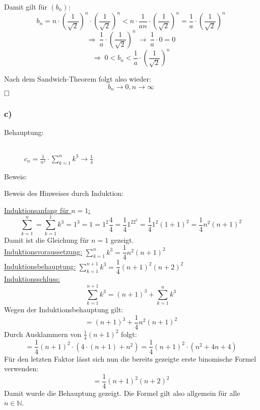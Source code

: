 \documentclass[10pt, a4paper]{article}
\begin{document}
			Damit gilt für $(b_n)$:
			\[
				b_n = n \cdot \left( \dfrac{1}{\sqrt{2}} \right)^{n} \cdot \left( \dfrac{1}{\sqrt{2}} \right)^{n} < n\cdot \dfrac{1}{an} \cdot \left( \dfrac{1}{\sqrt{2}} \right)^{n} = \dfrac{1}{a} \cdot \left(\dfrac{1}{\sqrt{2}}\right)^n
			\]
			\[
				\Rightarrow \ \dfrac{1}{a} \cdot \left(\dfrac{1}{\sqrt{2}}\right)^n \ \longrightarrow \ \dfrac{1}{a} \cdot 0 = 0 
			\]
			\[
				\Rightarrow \ 0 < b_n < \dfrac{1}{a} \cdot \left(\dfrac{1}{\sqrt{2}}\right)^n
			\]

			Nach dem Sandwich-Theorem folgt also wieder:
			\[
				b_n\longrightarrow 0,n\longrightarrow \infty
			\]
			$\hfill\Box$


		\subsubsection*{c)} %
		\label{ssub:c_}
		
			\begin{description}
				\item[Behauptung:] \hfill \\
					$c_n = \frac{1}{n^4}\cdot \sum_{k=1}^n k^3 \longrightarrow \frac{1}{4}$
				\item[Beweis:]
			\end{description}
			
			Beweis des Hinweises durch Induktion:

			\underline{Induktionsanfang für $n=1$:}\\
			\[
				\sum_{k=1}^n = \sum_{k=1}^1 k^3 = 1^3 = 1 = 1^2\dfrac{4}{4}= \dfrac{1}{4}1^22^2 = \dfrac{1}{4}1^2(1+1)^2 = \dfrac{1}{4}n^2(n+1)^2
			\]
			Damit ist die Gleichung für $n=1$ gezeigt.\\

			\underline{Induktionsvoraussetzung:} $\sum_{k=1}^n k^3 = \dfrac{1}{4}n^2(n+1)^2$ \\

			\underline{Induktionsbehauptung:} $\sum_{k=1}^{n+1} k^3 = \dfrac{1}{4}(n+1)^2(n+2)^2$\\

			\underline{Induktionsschluss:}
			\[
				\sum_{k=1}^{n+1} k^3 = (n+1)^3 + \sum_{k=1}^n k^3
			\]
			Wegen der Induktionsbehauptung gilt:
			\[
				= (n+1)^3 + \dfrac{1}{4}n^2(n+1)^2
			\]
			Durch Ausklammern von $\frac{1}{4}(n+1)^2$ folgt:
			\[
				= \dfrac{1}{4}(n+1)^2 \cdot (4\cdot(n+1) + n^2) = \dfrac{1}{4}(n+1)^2 \cdot (n^2 + 4n + 4)
			\]
			Für den letzten Faktor lässt sich nun die bereits gezeigte erste binomische Formel verwenden:
			\[
				= \dfrac{1}{4}(n+1)^2(n+2)^2
			\]
			Damit wurde die Behauptung gezeigt. Die Formel gilt also allgemein für alle $n \in \mathbb{N}$. \\
\end{document}

